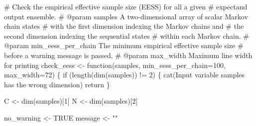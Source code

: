 \documentclass[
  letterpaper,
  DIV=11,
  numbers=noendperiod]{scrartcl}
\newenvironment{Shaded}{\begin{snugshade}}{\end{snugshade}}
\newcommand{\AttributeTok}[1]{\textcolor[rgb]{0.40,0.45,0.13}{#1}}
\newcommand{\CommentTok}[1]{\textcolor[rgb]{0.37,0.37,0.37}{#1}}
\newcommand{\ConstantTok}[1]{\textcolor[rgb]{0.56,0.35,0.01}{#1}}
\newcommand{\ControlFlowTok}[1]{\textcolor[rgb]{0.00,0.23,0.31}{#1}}
\newcommand{\DecValTok}[1]{\textcolor[rgb]{0.68,0.00,0.00}{#1}}
\newcommand{\FunctionTok}[1]{\textcolor[rgb]{0.28,0.35,0.67}{#1}}
\newcommand{\NormalTok}[1]{\textcolor[rgb]{0.00,0.23,0.31}{#1}}
\newcommand{\OtherTok}[1]{\textcolor[rgb]{0.00,0.23,0.31}{#1}}
\newcommand{\SpecialCharTok}[1]{\textcolor[rgb]{0.37,0.37,0.37}{#1}}
\newcommand{\StringTok}[1]{\textcolor[rgb]{0.13,0.47,0.30}{#1}}
\begin{document}
\begin{Shaded}
\begin{Highlighting}[]
\CommentTok{\# Check the empirical effective sample size (EESS) for all a given }
\CommentTok{\# expectand output ensemble.}
\CommentTok{\# @param samples A two{-}dimensional array of scalar Markov chain states }
\CommentTok{\#                with the first dimension indexing the Markov chains and }
\CommentTok{\#                the second dimension indexing the sequential states }
\CommentTok{\#                within each Markov chain.}
\CommentTok{\# @param min\_eess\_per\_chain The minimum empirical effective sample size}
\CommentTok{\#                           before a warning message is passed.}
\CommentTok{\# @param max\_width Maximum line width for printing}
\NormalTok{check\_eess }\OtherTok{\textless{}{-}} \ControlFlowTok{function}\NormalTok{(samples,}
                       \AttributeTok{min\_eess\_per\_chain=}\DecValTok{100}\NormalTok{,}
                       \AttributeTok{max\_width=}\DecValTok{72}\NormalTok{) \{}
  \ControlFlowTok{if}\NormalTok{ (}\FunctionTok{length}\NormalTok{(}\FunctionTok{dim}\NormalTok{(samples)) }\SpecialCharTok{!=} \DecValTok{2}\NormalTok{) \{}
    \FunctionTok{cat}\NormalTok{(}\StringTok{\textquotesingle{}Input variable \textasciigrave{}samples\textasciigrave{} has the wrong dimension\textquotesingle{}}\NormalTok{)}
\NormalTok{    return}
\NormalTok{  \}}
  
\NormalTok{  C }\OtherTok{\textless{}{-}} \FunctionTok{dim}\NormalTok{(samples)[}\DecValTok{1}\NormalTok{]}
\NormalTok{  N }\OtherTok{\textless{}{-}} \FunctionTok{dim}\NormalTok{(samples)[}\DecValTok{2}\NormalTok{]}
  
\NormalTok{  no\_warning }\OtherTok{\textless{}{-}} \ConstantTok{TRUE}
\NormalTok{  message }\OtherTok{\textless{}{-}} \StringTok{""}
  

\end{Highlighting}
\end{Shaded}
\end{document}
